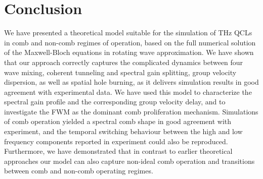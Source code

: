 \documentclass[10pt]{article}
\begin{document}
	\section{Conclusion}
	We have presented a theoretical model suitable for the simulation of THz QCLs
	in comb and non-comb regimes of operation, based on the full numerical
	solution of the Maxwell-Bloch equations in rotating wave approximation. We
	have shown that our approach correctly captures the complicated dynamics
	between four wave mixing, coherent tunneling and spectral gain splitting,
	group velocity dispersion, as well as spatial hole burning, as it delivers
	simulation results in good agreement with experimental data. We have used this
	model to characterize the spectral gain profile and the corresponding group
	velocity delay, and to investigate the FWM as the dominant comb proliferation
	mechanism. Simulations of comb operation yielded a spectral comb shape in good
	agreement with experiment, and the temporal switching behaviour between
	the high and low frequency components reported in experiment could also be
	reproduced. Furthermore, we have demonstrated that in contrast to earlier theoretical 
	approaches our model can also capture non-ideal comb operation and transitions between comb and
	non-comb operating regimes.
\end{document}
